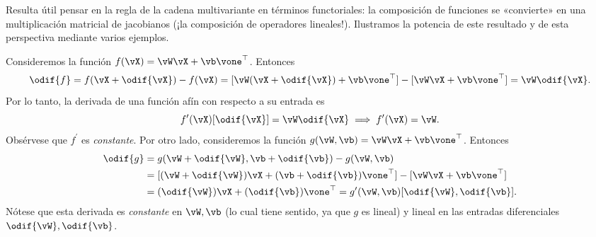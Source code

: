 \documentclass[../../book-main_es.tex]{subfiles}
\begin{document}
Resulta útil pensar en la regla de la cadena multivariante en términos functoriales:
la composición de funciones se «convierte» en una multiplicación matricial de jacobianos
(¡la composición de operadores lineales!).
Ilustramos la potencia de este resultado y de esta perspectiva mediante varios
ejemplos.

\begin{example}
    Consideremos la función \(f(\vX) = \vW\vX + \vb\vone^{\top}\). Entonces
    \begin{equation}
        \odif{f} = f(\vX + \odif{\vX}) - f(\vX) = [\vW(\vX +
        \odif{\vX}) + \vb\vone^{\top}] - [\vW \vX + \vb \vone^{\top}]
        = \vW\odif{\vX}.
    \end{equation}
    Por lo tanto, la derivada de una función afín con respecto a su entrada es
    \begin{equation}
        f^{\prime}(\vX)[\odif{\vX}] = \vW\odif{\vX} \implies
        f^{\prime}(\vX) = \vW.
    \end{equation}
    Obsérvese que \(f^{\prime}\) es \textit{constante}. Por otro
    lado, consideremos la función \(g(\vW, \vb) = \vW\vX + \vb\vone^{\top}\). Entonces
    \begin{align}
        \odif{g}
        &= g(\vW + \odif{\vW}, \vb + \odif{\vb}) - g(\vW, \vb)
        \\ 
        &=
        [(\vW + \odif{\vW})\vX + (\vb + \odif{\vb})\vone^{\top}] -
        [\vW\vX + \vb\vone^{\top}] \\
        &= (\odif{\vW})\vX + (\odif{\vb})\vone^{\top} =
        g^{\prime}(\vW, \vb)[\odif{\vW}, \odif{\vb}].
    \end{align}
    Nótese que esta derivada es \textit{constante} en \(\vW, \vb\)
    (lo cual tiene sentido, ya que \(g\) es lineal) y lineal en
    las entradas diferenciales \(\odif{\vW}, \odif{\vb}\).
\end{example}
\end{document}
